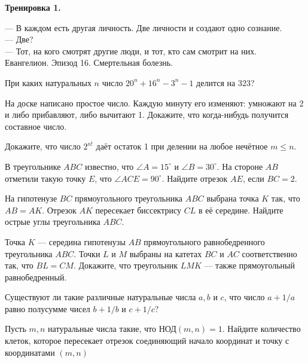 \hspace{3mm}

\centerline{\bf \Huge Тренировка 1.}

\begin{flushright}
        \scriptsize{— В каждом есть другая личность. Две личности и создают одно сознание.\\
        — Две?\\ 
        — Тот, на кого смотрят другие люди, и тот, кто сам смотрит на них.\\
        Евангелион. Эпизод 16. Смертельная болезнь.
}
\end{flushright}


При каких  натуральных $n$ число $20^n + 16^n - 3^n - 1$ делится на $323$?

На доске написано простое число. Каждую минуту его изменяют: умножают на 2 и либо прибавляют, либо вычитают 1. Докажите, что когда-нибудь получится составное число.

Докажите, что число $2^{n!}$ даёт остаток 1 при делении на любое нечётное $m \leq n.$

В треугольнике $A B C$ известно, что $\angle A=15^{\circ}$ и $\angle B=30^{\circ}$. На стороне $A B$ отметили такую точку $E$, что $\angle A C E=90^{\circ}$. Найдите отрезок $A E$, если $B C=2.$

На гипотенузе $BC$ прямоугольного треугольника $ABC$ выбрана точка $K$ так, что $AB = AK$. Отрезок $AK$ пересекает биссектрису $CL$ в её середине. Найдите острые углы треугольника $ABC$.

Точка $K$ --- середина гипотенузы $AB$ прямоугольного равнобедренного треугольника $ABC$. Точки $L$ и $M$ выбраны на катетах $BC$ и $AC$ соответственно так, что $BL = CM$. Докажите, что треугольник $LMK$ --- также прямоугольный равнобедренный.


Существуют ли такие различные натуральные числа $a, b$ и $c$, что число $a+1/a$ равно полусумме чисел $b+1/b$ и $c+1/c?$

Пусть $m,n$ натуральные числа такие, что НОД$(m, n) = 1$. Найдите количество клеток, которое пересекает отрезок соединяющий начало координат и точку с координатами $(m, n)$